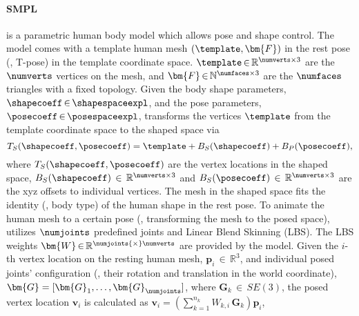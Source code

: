 %
%


\paragraph{SMPL~\cite{SMPL:2015}} is a parametric human body model which allows pose and shape control. 
%
The \smpl model comes with a template human mesh $(\template, \bm{F})$ in the rest pose (\ie, T-pose) in the template coordinate space. 
%
$\template \, {\in} \, \mathbb{R}^{\numverts \times 3}$ are the $\numverts$ vertices on the mesh, and $\bm{F} \, {\in} \, \mathbb{N}^{\numfaces\times 3}$ are the $\numfaces$ triangles with a fixed topology. 
%
Given the body shape parameters, $\shapecoeff \, {\in} \, \shapespaceexpl$, and the pose parameters, $\posecoeff \, {\in} \, \posespaceexpl$, \smpl transforms the vertices $\template$ from the template coordinate space to the shaped space via
%
\begin{equation}
    T_S(\shapecoeff, \posecoeff) = \template + B_{S}(\shapecoeff) +  B_{P}(\posecoeff),
    \label{eq:smpl vertex}
\end{equation}
%
where $T_S(\shapecoeff, \posecoeff)$ are the vertex locations in the shaped space, $B_{S}(\shapecoeff) \, \in \, \mathbb{R}^{\numverts \times 3}$ and $B_{S}(\posecoeff) \, \in \, \mathbb{R}^{\numverts \times 3}$ are the xyz offsets to individual vertices.
%
The mesh in the shaped space fits the identity (\eg, body type) of the human shape in the rest pose. 
%
%
To animate the human mesh to a certain pose (\ie, transforming the mesh to the posed space), \smpl utilizes $\numjoints$ predefined joints and Linear Blend Skinning (LBS).
%
The LBS weights $\bm{W} \, {\in} \, \mathbb{R}^{\numjoints {\times} \numverts}$ are provided by the \smpl model.
%
Given the $i$-th vertex location on the resting human mesh, $\bm{p}_i \, {\in} \, \mathbb{R}^3$, and individual posed joints' configuration (\ie, their rotation and translation in the world coordinate), $\bm{G} = [\bm{G}_1, \dots, \bm{G}_{\numjoints}]$, where $\bm{G}_k \, {\in} \, SE(3)$, the posed vertex location $\bm{v}_i$ is calculated as $\bm{v}_i = \left( \sum_{k=1}^{n_k} W_{k,i} \, \bm{G}_k \right) \bm{p}_i$, 
